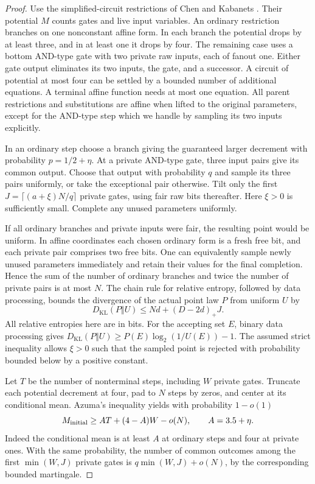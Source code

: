 \documentclass[11pt]{article}
\newcommand{\KL}{D_{\mathrm{KL}}}
\begin{document}
\begin{proof}
Use the simplified-circuit restrictions of Chen and Kabanets \cite[Section 4.1, Lemma 4.1]{ck}. Their potential $M$ counts gates and live input variables. An ordinary restriction branches on one nonconstant affine form. In each branch the potential drops by at least three, and in at least one it drops by four. The remaining case uses a bottom AND-type gate with two private raw inputs, each of fanout one. Either gate output eliminates its two inputs, the gate, and a successor. A circuit of potential at most four can be settled by a bounded number of additional equations. A terminal affine function needs at most one equation. All parent restrictions and substitutions are affine when lifted to the original parameters, except for the AND-type step which we handle by sampling its two inputs explicitly.

In an ordinary step choose a branch giving the guaranteed larger decrement with probability $p=1/2+\eta$. At a private AND-type gate, three input pairs give its common output. Choose that output with probability $q$ and sample its three pairs uniformly, or take the exceptional pair otherwise. Tilt only the first $J=\lceil(a+\xi)N/q\rceil$ private gates, using fair raw bits thereafter. Here $\xi>0$ is sufficiently small. Complete any unused parameters uniformly.

If all ordinary branches and private inputs were fair, the resulting point would be uniform. In affine coordinates each chosen ordinary form is a fresh free bit, and each private pair comprises two free bits. One can equivalently sample newly unused parameters immediately and retain their values for the final completion. Hence the sum of the number of ordinary branches and twice the number of private pairs is at most $N$. The chain rule for relative entropy, followed by data processing, bounds the divergence of the actual point law $P$ from uniform $U$ by
\[
 \KL(P\Vert U)\le Nd+(D-2d)_+J.
\]
All relative entropies here are in bits. For the accepting set $E$, binary data processing gives $\KL(P\Vert U)\ge P(E)\log_2(1/U(E))-1$. The assumed strict inequality allows $\xi>0$ such that the sampled point is rejected with probability bounded below by a positive constant.

Let $T$ be the number of nonterminal steps, including $W$ private gates. Truncate each potential decrement at four, pad to $N$ steps by zeros, and center at its conditional mean. Azuma's inequality yields with probability $1-o(1)$
\[
 M_{\rm initial}\ge A T+(4-A)W-o(N),\qquad A=3.5+\eta .
\]
Indeed the conditional mean is at least $A$ at ordinary steps and four at private ones. With the same probability, the number of common outcomes among the first $\min(W,J)$ private gates is $q\min(W,J)+o(N)$, by the corresponding bounded martingale.


\end{proof}
\end{document}
